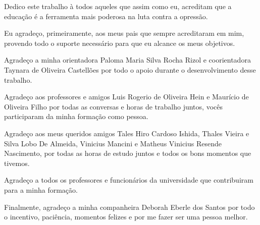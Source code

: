 \documentclass[
  12pt,		%
  a4paper,	%
  openright,%
  oneside,	%
  chapter=TITLE,		%
  section=TITLE,		%
  english,	%
  french,	%
  spanish,	%
  brazil	%
]{abntex2}
\begin{document}
    \begin{dedicatoria}
        \vspace*{\fill}
        \begin{flushright}
            Dedico este trabalho à todos aqueles que assim como eu, 
            acreditam que a educação é a ferramenta mais poderosa na luta contra a opressão. 
        \end{flushright}
        \vspace*{1cm}
    \end{dedicatoria}

    \begin{agradecimentos}
    
        Eu agradeço, primeiramente, aos meus pais que sempre acreditaram em mim, provendo todo o 
        suporte necessário para que eu alcance os meus objetivos.

        Agradeço a minha orientadora Paloma Maria Silva Rocha Rizol e coorientadora Taynara de Oliveira Castellões
        por todo o apoio durante o desenvolvimento desse trabalho.
        
        Agradeço aos professores e amigos
        Luis Rogerio de Oliveira Hein e Maurício de Oliveira Filho por todas as conversas e horas
        de trabalho juntos, vocês participaram da minha formação como pessoa. 
        
        Agradeço aos meus queridos amigos Tales Hiro Cardoso Ishida, Thales Vieira e Silva 
        Lobo De Almeida, Vinicius Mancini e Matheus Vinicius Resende Nascimento, 
        por todas as horas de estudo juntos e
        todos os bons momentos que tivemos.
        
        Agradeço a todos os professores e funcionários da universidade que contribuiram para a minha formação. 
        
        Finalmente, agradeço a minha companheira Deborah Eberle dos Santos por todo o incentivo, paciência,
        momentos felizes e por me fazer ser uma pessoa melhor.
    
    \end{agradecimentos}
    
\end{document}
